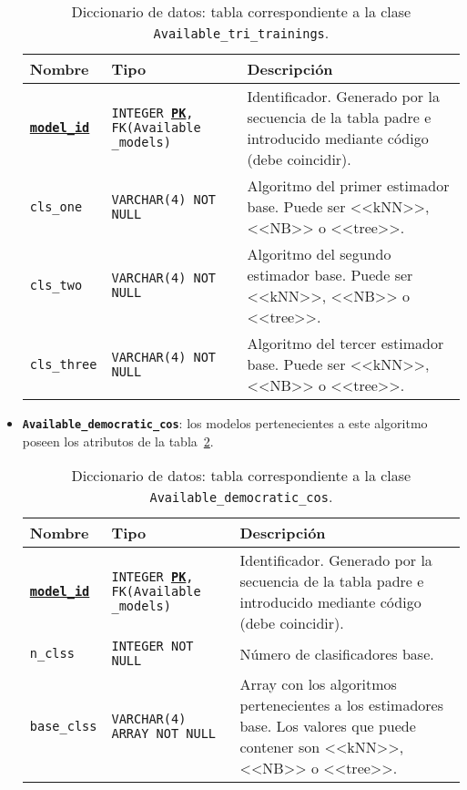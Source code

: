\begin{itemize}
	\begin{table}
		\small
		\begin{centering}
			\begin{tabular}{@{}p{6em} p{12em} p{16em}@{}}
				\toprule
				\textbf{Nombre} & \textbf{Tipo} & \textbf{Descripción}\\
				\midrule
				\texttt{\textbf{\underline{model\_id}}} & \texttt{INTEGER \textbf{\underline{PK}}, FK(Available \_models)} & Identificador. Generado por la secuencia de la tabla padre e introducido mediante código (debe coincidir).\\
				\texttt{cls\_one} & \texttt{VARCHAR(4) NOT NULL}  &  Algoritmo del primer estimador base. Puede ser <<kNN>>, <<NB>> o <<tree>>.\\
				\texttt{cls\_two} & \texttt{VARCHAR(4) NOT NULL} & Algoritmo del segundo estimador base. Puede ser <<kNN>>, <<NB>> o <<tree>>.\\
				\texttt{cls\_three} & \texttt{VARCHAR(4) NOT NULL} & Algoritmo del tercer estimador base. Puede ser <<kNN>>, <<NB>> o <<tree>>.\\
				\bottomrule
			\end{tabular}
		\end{centering}
		\caption[Diccionario de datos: Available\_tri\_trainings]{Diccionario de datos: tabla correspondiente a la clase \texttt{Available\_tri\_trainings}.}
		\label{datadic:tritraining}
	\end{table}

	\item \textbf{\texttt{Available\_democratic\_cos}}: los modelos pertenecientes a este algoritmo poseen los atributos de la tabla~\ref{datadic:democraticco}.

	\begin{table}
		\small
		\begin{centering}
			\begin{tabular}{@{}p{6em} p{8em} p{19em}@{}}
				\toprule
				\textbf{Nombre} & \textbf{Tipo} & \textbf{Descripción}\\
				\midrule
				\texttt{\textbf{\underline{model\_id}}} & \texttt{INTEGER \textbf{\underline{PK}}, FK(Available \_models)} & Identificador. Generado por la secuencia de la tabla padre e introducido mediante código (debe coincidir).\\
				\texttt{n\_clss} & \texttt{INTEGER NOT NULL} & Número de clasificadores base.\\
				\texttt{base\_clss} & \texttt{VARCHAR(4) ARRAY NOT NULL}  & Array con los algoritmos pertenecientes a los estimadores base. Los valores que puede contener son <<kNN>>, <<NB>> o <<tree>>.\\
				\bottomrule
			\end{tabular}
		\end{centering}
		\caption[Diccionario de datos: Available\_democratic\_cos]{Diccionario de datos: tabla correspondiente a la clase \texttt{Available\_democratic\_cos}.}
		\label{datadic:democraticco}
	\end{table}
\end{itemize}

